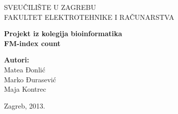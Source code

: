 \begin{titlepage}

\begin{center}
	
	{\large SVEUČILIŠTE U ZAGREBU\\FAKULTET ELEKTROTEHNIKE I RAČUNARSTVA}
	
	\vfill

	\textbf{ \large Projekt iz kolegija bioinformatika} \\


	\vspace{20pt}
	\textbf{\huge FM-index count}
	\vspace{40pt}
	
	\bigskip
	
	\begin{minipage}{1.0\textwidth}
	\begin{center} 
	\textbf{Autori:}\\
	Matea Đonlić  \\
	Marko Đurasević \\
	Maja Kontrec \\

	
	\end{center}
	\end{minipage}
	\vfill

	{\large Zagreb, 2013.}
	
\end{center}

\end{titlepage}